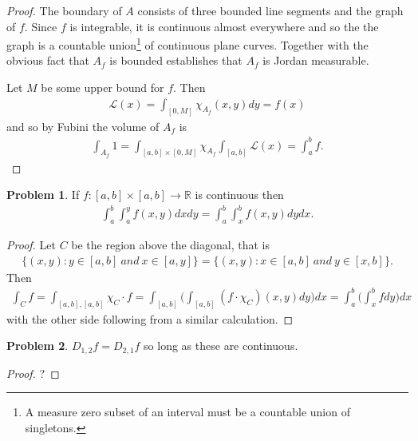\documentclass[20pt]{article}
\theoremstyle{plain}
\theoremstyle{definition}
\newtheorem*{problem}{Problem}
\newcommand{\reals}{\mathbb{R}}
\begin{document}
\begin{proof}
  The boundary of $A$ consists of three bounded line segments and the graph of $f$.
  Since $f$ is integrable, it is continuous almost everywhere and so the 
  the graph is a countable union\footnote{A measure zero subset of an interval must be a countable union of singletons.}
   of continuous plane curves.  Together with 
  the obvious fact that $A_f$ is bounded establishes that $A_f$ is 
  Jordan measurable.

  Let $M$ be some upper bound for $f$.  Then 
  \begin{align*}
    \mathcal{L}(x) = \int_{[0, M]} \chi_{A_f}(x, y)dy = f(x)
  \end{align*}
  and so by Fubini the volume of $A_f$ is 
  \begin{align*}
    \int_{A_f}1 = 
    \int_{[a, b]\times[0, M]} \chi_{A_f}
    \int_{[a, b]} \mathcal{L}(x) = 
    \int_a^b f.
  \end{align*}
\end{proof}



\begin{problem}{3.27}
  If $f: [a, b] \times [a, b] \to \reals$ is continuous then 
  \begin{align*}
    \int_a^b \int_a^y f(x, y)dxdy = \int_a^b \int_x^b f(x, y)dy  dx.
  \end{align*}
\end{problem}

\begin{proof}
  Let $C$ be the region above the diagonal, that is 
  \begin{align*}
    \{ (x, y) : y \in [a, b]\ and \ x \in [a, y] \} = 
    \{ (x, y) : x \in [a, b]\ and \ y \in [x, b] \}.
  \end{align*}
  Then 
  \begin{align*}
    \int_C f = 
    \int_{[a, b], [a, b]}\chi_C \cdot f = 
    \int_{[a, b]}\bigg(\int_{[a, b]}(f\cdot \chi_C)(x, y)dy\bigg)dx = 
    \int_a^b \bigg(\int_x^b f dy\bigg)dx
  \end{align*}
  with the other side following from a similar calculation.
\end{proof}


\begin{problem}{3.28}
  $D_{1, 2}f = D_{2, 1}f$ so long as these are continuous.
\end{problem}
\begin{proof}
  \color{ForestGreen}?
\end{proof}
\end{document}
